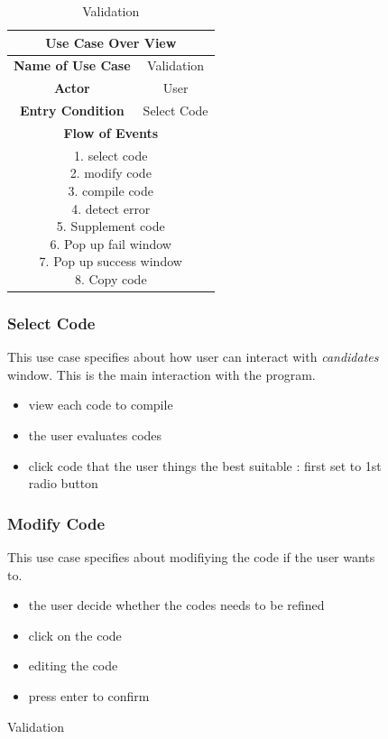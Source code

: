 \documentclass[conference]{IEEEtran}
\begin{document}
\begin{itemize}
\begin{itemize}
\begin{itemize}
\begin{itemize}
\begin{figure}[h]
\begin{enumerate}
\begin{itemize}
\begin{enumerate}
\begin{table}[hbt]
\renewcommand{\arraystretch}{1}
\caption{Validation}
\label{table:usecase3}
\centering
\begin{adjustbox}{width=0.4\textwidth}
\small
\begin{tabular}{c|c}
\hline
\multicolumn{2}{c}{\textbf{Use Case Over View}} \\
\hline
\textbf{Name of Use Case} & Validation \\
\hline
\textbf{Actor} & User \\
\hline
\textbf{Entry Condition} & Select Code\\
\hline
\multicolumn{2}{c}{\textbf{Flow of Events}}\\
\hline
\multicolumn{2}{c}{
\parbox[t]{5cm}{
  1. select code \\
  2. modify code \\
  3. compile code \\
  4. detect error \\
  5. Supplement code \\
  6. Pop up fail window \\
  7. Pop up success window \\
  8. Copy code
  }
}\\
\hline

\end{tabular}
\end{adjustbox}
\end{table}



\subsubsection{Select Code}
This use case specifies about how user can interact with \textit{candidates} window. This is the main interaction with the program.
\begin{itemize}
  \item view each code to compile
  \item the user evaluates codes
  \item click code that the user things the best suitable : first set to 1st radio button
\end{itemize}
\textit{}


\subsubsection{Modify Code}
This use case specifies about modifiying the code if the user wants to.
\begin{itemize}
  \item the user decide whether the codes needs to be refined
  \item click on the code
  \item editing the code
  \item press enter to confirm
\end{itemize}
\textit{}



\end{enumerate}
\end{itemize}
\end{enumerate}
\end{figure}
\end{itemize}
\end{itemize}
\end{itemize}
\end{itemize}
\end{document}
